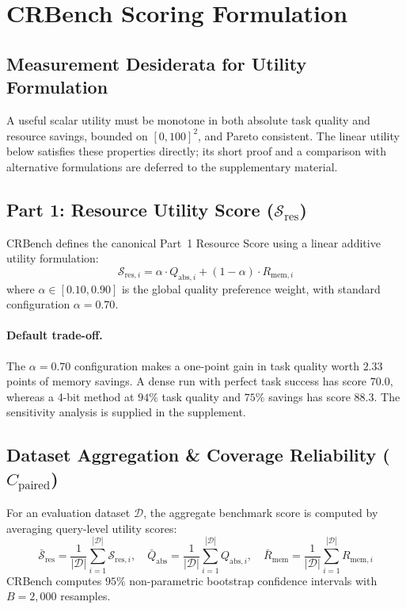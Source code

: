 \documentclass[10pt]{article}
\theoremstyle{definition}
\begin{document}
\section{CRBench Scoring Formulation}
\label{sec:scoring}

\subsection{Measurement Desiderata for Utility Formulation}
A useful scalar utility must be monotone in both absolute task quality and resource savings, bounded on $[0,100]^2$, and Pareto consistent. The linear utility below satisfies these properties directly; its short proof and a comparison with alternative formulations are deferred to the supplementary material.

\subsection{Part 1: Resource Utility Score (\texorpdfstring{$\mathcal{S}_{\text{res}}$}{S\_res})}
CRBench defines the canonical Part~1 Resource Score using a linear additive utility formulation:
\begin{equation}
\label{eq:part1_score}
\mathcal{S}_{\text{res}, i} = \alpha \cdot Q_{\text{abs},i} + (1 - \alpha) \cdot R_{\text{mem}, i}
\end{equation}
where $\alpha \in [0.10, 0.90]$ is the global quality preference weight, with standard configuration $\alpha = 0.70$.

\paragraph{Default trade-off.} The $\alpha=0.70$ configuration makes a one-point gain in task quality worth $2.33$ points of memory savings. A dense run with perfect task success has score $70.0$, whereas a 4-bit method at $94\%$ task quality and $75\%$ savings has score $88.3$. The sensitivity analysis is supplied in the supplement.

\subsection{Dataset Aggregation \& Coverage Reliability (\texorpdfstring{$C_{\text{paired}}$}{C\_paired})}
For an evaluation dataset $\mathcal{D}$, the aggregate benchmark score is computed by averaging query-level utility scores:
\begin{equation}
\label{eq:dataset_aggregation}
\bar{\mathcal{S}}_{\text{res}} = \frac{1}{|\mathcal{D}|} \sum_{i=1}^{|\mathcal{D}|} \mathcal{S}_{\text{res}, i}, \quad 
\bar{Q}_{\text{abs}} = \frac{1}{|\mathcal{D}|} \sum_{i=1}^{|\mathcal{D}|} Q_{\text{abs},i}, \quad 
\bar{R}_{\text{mem}} = \frac{1}{|\mathcal{D}|} \sum_{i=1}^{|\mathcal{D}|} R_{\text{mem}, i}
\end{equation}
CRBench computes $95\%$ non-parametric bootstrap confidence intervals with $B = 2,000$ resamples.
\end{document}
